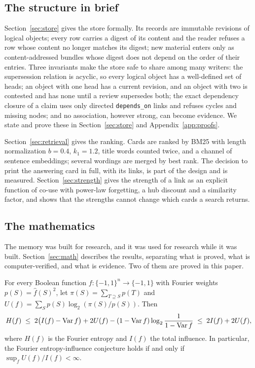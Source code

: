 \subsection{The structure in brief}

Section~\ref{sec:store} gives the store formally. Its records are immutable revisions of logical objects; every row carries a digest of its content and the reader refuses a row whose content no longer matches its digest; new material enters only as content-addressed bundles whose digest does not depend on the order of their entries. Three invariants make the store safe to share among many writers: the supersession relation is acyclic, so every logical object has a well-defined set of heads; an object with one head has a current revision, and an object with two is contested and has none until a review supersedes both; the exact dependency closure of a claim uses only directed \texttt{depends\_on} links and refuses cycles and missing nodes; and no association, however strong, can become evidence. We state and prove these in Section~\ref{sec:store} and Appendix~\ref{app:proofs}.

Section~\ref{sec:retrieval} gives the ranking. Cards are ranked by BM25 \cite{RobertsonZaragoza2009} with length normalization $b=0.4$, $k_1=1.2$, title words counted twice, and a channel of sentence embeddings; several wordings are merged by best rank. The decision to print the answering card in full, with its links, is part of the design and is measured. Section~\ref{sec:strength} gives the strength of a link as an explicit function of co-use with power-law forgetting, a hub discount and a similarity factor, and shows that the strengths cannot change which cards a search returns.

\subsection{The mathematics}

The memory was built for research, and it was used for research while it was built. Section~\ref{sec:math} describes the results, separating what is proved, what is computer-verified, and what is evidence. Two of them are proved in this paper.

\begin{theorem}\label{thm:intro-G}
For every Boolean function $f:\{-1,1\}^n\to\{-1,1\}$ with Fourier weights $p(S)=\hat f(S)^2$, let $\pi(S)=\sum_{T\supseteq S}p(T)$ and $U(f)=\sum_S p(S)\log_2(\pi(S)/p(S))$. Then
\[
H(f)\;\le\;2\bigl(I(f)-\operatorname{Var} f\bigr)+2U(f)-(1-\operatorname{Var} f)\log_2\frac{1}{1-\operatorname{Var} f}\;\le\;2I(f)+2U(f),
\]
where $H(f)$ is the Fourier entropy and $I(f)$ the total influence. In particular, the Fourier entropy-influence conjecture holds if and only if $\sup_f U(f)/I(f)<\infty$. 
\end{theorem}

